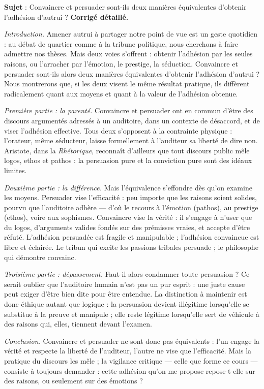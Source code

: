 \documentclass[11pt]{article}
\begin{document}
\begin{exoresolu}
\textbf{Sujet} : Convaincre et persuader sont-ils deux manières équivalentes d'obtenir l'adhésion d'autrui ?
\tcblower
\textbf{Corrigé détaillé.}

\emph{Introduction.} Amener autrui à partager notre point de vue est un geste quotidien : au débat de quartier comme à la tribune politique, nous cherchons à faire admettre nos thèses. Mais deux voies s'offrent : obtenir l'adhésion par les seules raisons, ou l'arracher par l'émotion, le prestige, la séduction. Convaincre et persuader sont-ils alors deux manières équivalentes d'obtenir l'adhésion d'autrui ? Nous montrerons que, si les deux visent le même résultat pratique, ils diffèrent radicalement quant aux moyens et quant à la valeur de l'adhésion obtenue.

\emph{Première partie : la parenté.} Convaincre et persuader ont en commun d'être des discours argumentés adressés à un auditoire, dans un contexte de désaccord, et de viser l'adhésion effective. Tous deux s'opposent à la contrainte physique : l'orateur, même séducteur, laisse formellement à l'auditeur sa liberté de dire non. Aristote, dans la \emph{Rhétorique}, reconnaît d'ailleurs que tout discours public mêle logos, ethos et pathos : la persuasion pure et la conviction pure sont des idéaux limites.

\emph{Deuxième partie : la différence.} Mais l'équivalence s'effondre dès qu'on examine les moyens. Persuader vise l'efficacité : peu importe que les raisons soient solides, pourvu que l'auditoire adhère — d'où le recours à l'émotion (pathos), au prestige (ethos), voire aux sophismes. Convaincre vise la vérité : il s'engage à n'user que du logos, d'arguments valides fondés sur des prémisses vraies, et accepte d'être réfuté. L'adhésion persuadée est fragile et manipulable ; l'adhésion convaincue est libre et éclairée. Le tribun qui excite les passions tribales persuade ; le philosophe qui démontre convainc.

\emph{Troisième partie : dépassement.} Faut-il alors condamner toute persuasion ? Ce serait oublier que l'auditoire humain n'est pas un pur esprit : une juste cause peut exiger d'être bien dite pour être entendue. La distinction à maintenir est donc éthique autant que logique : la persuasion devient illégitime lorsqu'elle se substitue à la preuve et manipule ; elle reste légitime lorsqu'elle sert de véhicule à des raisons qui, elles, tiennent devant l'examen.

\emph{Conclusion.} Convaincre et persuader ne sont donc pas équivalents : l'un engage la vérité et respecte la liberté de l'auditeur, l'autre ne vise que l'efficacité. Mais la pratique du discours les mêle ; la vigilance critique — celle que forme ce cours — consiste à toujours demander : cette adhésion qu'on me propose repose-t-elle sur des raisons, ou seulement sur des émotions ?
\end{exoresolu}
\end{document}
